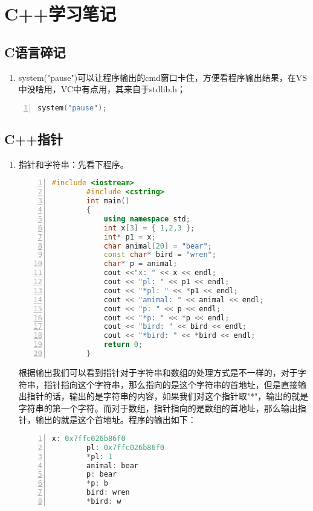 \chapter{C++学习笔记}
\section{C语言碎记}
\begin{enumerate}
\item system("pause")可以让程序输出的cmd窗口卡住，方便看程序输出结果，在VS中没啥用，VC中有点用，其来自于stdlib.h；

\end{enumerate}





\begin{lstlisting}[language=C++, numbers=left, 
         numberstyle=\tiny,keywordstyle=\color{blue!70},
         commentstyle=\color{red!50!green!50!blue!50},frame=shadowbox,
         rulesepcolor=\color{red!20!green!20!blue!20},basicstyle=\ttfamily]
system("pause");
\end{lstlisting}


\section{C++指针} %
\label{sec:c_指针}
\begin{enumerate}
	\item 指针和字符串：先看下程序。
	\begin{lstlisting}[language=C++, numbers=left, 
         numberstyle=\tiny,keywordstyle=\color{blue!70},
         commentstyle=\color{red!50!green!50!blue!50},frame=shadowbox,
         rulesepcolor=\color{red!20!green!20!blue!20},basicstyle=\ttfamily]
		#include <iostream>
		#include <cstring>
		int main()
		{
			using namespace std;
			int x[3] = { 1,2,3 };
			int* p1 = x;
			char animal[20] = "bear";
			const char* bird = "wren";
			char* p = animal;
			cout <<"x: " << x << endl;
			cout << "pl: " << p1 << endl;
			cout << "*pl: " << *p1 << endl;
			cout << "animal: " << animal << endl;
			cout << "p: " << p << endl;
			cout << "*p: " << *p << endl;
			cout << "bird: " << bird << endl;
			cout << "*bird: " << *bird << endl;
			return 0;
		}
	\end{lstlisting}
	根据输出我们可以看到指针对于字符串和数组的处理方式是不一样的，对于字符串，指针指向这个字符串，那么指向的是这个字符串的首地址，但是直接输出指针的话，输出的是字符串的内容，如果我们对这个指针取"*"，输出的就是字符串的第一个字符。而对于数组，指针指向的是数组的首地址，那么输出指针，输出的就是这个首地址。程序的输出如下：
	\begin{lstlisting}[language=C++, numbers=left, 
         numberstyle=\tiny,keywordstyle=\color{blue!70},
         commentstyle=\color{red!50!green!50!blue!50},frame=shadowbox,
         rulesepcolor=\color{red!20!green!20!blue!20},basicstyle=\ttfamily]
		x: 0x7ffc026b86f0
		pl: 0x7ffc026b86f0
		*pl: 1
		animal: bear
		p: bear
		*p: b
		bird: wren
		*bird: w
	\end{lstlisting}
\end{enumerate}
